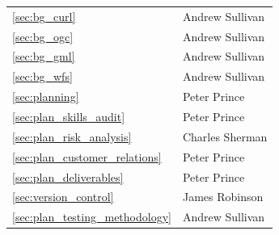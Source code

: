 \documentclass[a4paper, 12pt, twoside]{article}
\newcommand*{\fullref}[1]{\ref{#1} \nameref{#1}}
\begin{document}
\begin{tabularx}{\textwidth}{|X|X|}
  \fullref{sec:bg_curl}                  & Andrew Sullivan                    \\
  \fullref{sec:bg_ogc}                  & Andrew Sullivan                    \\
  \fullref{sec:bg_gml}                  & Andrew Sullivan                    \\
  \fullref{sec:bg_wfs}                   & Andrew Sullivan                                       \\ \hline
  \fullref{sec:planning}                 & Peter Prince                       \\
  \fullref{sec:plan_skills_audit}        & Peter Prince                       \\
  \fullref{sec:plan_risk_analysis}       & Charles Sherman                    \\
  \fullref{sec:plan_customer_relations}  & Peter Prince                       \\
  \fullref{sec:plan_deliverables}        & Peter Prince                       \\
  \fullref{sec:version_control}          & James Robinson                     \\
  \fullref{sec:plan_testing_methodology} & Andrew Sullivan                    \\ \hline
\end{tabularx}
\newpage
\end{document}
